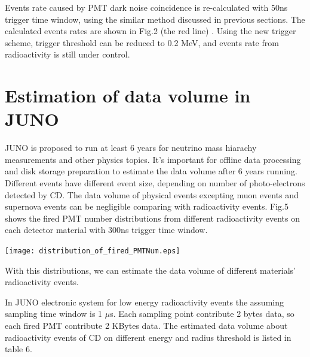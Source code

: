 \documentclass[a4paper,10pt,twoside]{paper}
\begin{document}
	\begin{multicols}{2}

		Events rate caused by PMT dark noise coincidence is re-calculated with 50ns trigger time window, 
		using the similar method discussed in previous sections. The calculated events rates are shown in Fig.2 (the red line) .
		Using the new trigger scheme, trigger threshold can be reduced to 0.2 MeV, and events rate from radioactivity is still under control.


		\section{Estimation of data volume in JUNO}
		JUNO is proposed to run at least 6 years for neutrino mass hiarachy measurements and other physics topics. 
		It's important for offline data processing and disk storage preparation to estimate the data volume after 6 years running. 
		Different events have different event size, depending on number of photo-electrons detected by CD.
		The data volume of physical events excepting muon events and supernova events can be negligible comparing with radioactivity events. 
		Fig.5  shows the fired PMT number distributions from different radioactivity events on each detector material with 300ns trigger time window.

		\begin{center}
			\texttt{[image: distribution\_of\_fired\_PMTNum.eps]}
		\end{center}


		With this distributions, we can estimate the data volume of different materials' radioactivity events. 

		In JUNO electronic system for low energy radioactivity events the assuming sampling time window is 1 $\mu$s. Each sampling point contribute 2 bytes data, so each fired PMT contribute 2 KBytes data. The estimated data volume about radioactivity events of CD on different energy and radius threshold is listed in table 6.

	\end{multicols}
\end{document}
